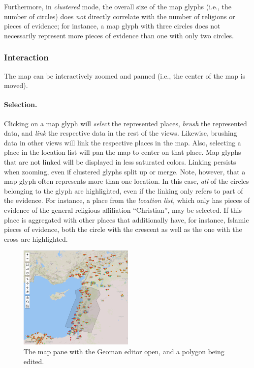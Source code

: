 Furthermore, in \emph{clustered} mode, the overall size of the map glyphs (i.e., the number of circles) does \emph{not} directly correlate with the number of religions or pieces of evidence;
for instance, a map glyph with three circles does not necessarily represent more pieces of evidence than one with only two circles.


\subsubsection{Interaction}

The map can be interactively zoomed and panned (i.e., the center of the map is moved).

\paragraph{Selection.}
Clicking on a map glyph will \emph{select} the represented places, \emph{brush} the represented data, and \emph{link} the respective data in the rest of the views.
Likewise, brushing data in other views will link the respective places in the map.
Also, selecting a place in the location list will pan the map to center on that place.
Map glyphs that are not linked will be displayed in less saturated colors.
Linking persists when zooming, even if clustered glyphs split up or merge.
Note, however, that a map glyph often represents more than one location.
In this case, \emph{all} of the circles belonging to the glyph are highlighted, even if the linking only refers to part of the evidence.
For instance, a place from the \emph{location list,} which only has pieces of evidence of the general religious affiliation \enquote{Christian}, may be selected.
If this place is aggregated with other places that additionally have, for instance, Islamic pieces of evidence, both the circle with the crescent as well as the one with the cross are highlighted.

\begin{figure}[tb]
  \centering
  \includegraphics[width=0.5\textwidth]{../src/assets/visualization-documentation/map-3.png}
  \caption{
    The map pane with the Geoman editor open, and a polygon being edited.
  }
  \label{fig:map-3}
\end{figure}

